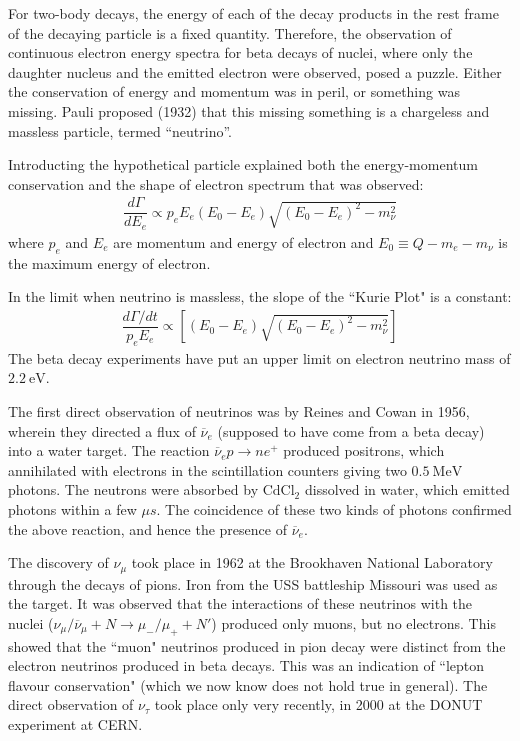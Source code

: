 For two-body decays, the energy of each of the decay products in the rest frame of the decaying particle is a fixed quantity. Therefore, the observation of continuous electron energy spectra for beta decays of nuclei, where only the daughter nucleus and the emitted electron were observed, posed a puzzle. Either the conservation of energy and momentum was in peril, or something was missing. Pauli proposed (1932) that this missing something is a chargeless and massless particle, termed “neutrino”.

Introducting the hypothetical particle explained both the energy-momentum conservation and the shape of electron spectrum that was observed: 
\begin{eqnarray}
    \dfrac{d \Gamma}{d E_e} \propto p_e E_e\left(E_0 - E_e\right) \sqrt{\left(E_0 - E_e\right)^2 - m_\nu ^2}
\end{eqnarray}
where \(p_e\) and \(E_e\) are momentum and energy of electron and \(E_0 \equiv Q - m_e - m_\nu\) is the maximum energy of electron. 

In the limit when neutrino is massless, the slope of the ``Kurie Plot" is a constant:
\begin{eqnarray}
    \dfrac{d\Gamma / dt}{p_e E_e} \propto \left[(E_0 - E_e)\sqrt{(E_0 - E_e)^2 - m_\nu ^2}\right]
\end{eqnarray}
The beta decay experiments have put an upper limit on electron neutrino mass of \(2.2~\mathrm{eV}\). 

The first direct observation of neutrinos was by Reines and Cowan in 1956\cite{cowan1956detection}, wherein they directed a flux of \(\overline {\nu} _e\) (supposed to have come from a beta decay) into a water target. The reaction \(\overline {\nu} _e p \to n e^+\) produced positrons, which annihilated with electrons in the scintillation counters giving two $0.5 ~\mathrm{MeV}$ photons. The neutrons were absorbed by $\mathrm{CdCl_2}$ dissolved in water, which emitted photons within a few $\mu s$. The coincidence of these two kinds of photons confirmed the above reaction, and hence the presence of \(\overline {\nu} _e\). 

The discovery of \({\nu} _\mu\) took place in 1962 at the Brookhaven National Laboratory \cite{brookhaven} through the decays of pions. Iron from the USS battleship Missouri was used as the target. It was observed that the interactions of these neutrinos with the nuclei (\(\nu_\mu /\overline {\nu}_\mu +N \to \mu _ - /\mu _+ + N' \)) produced only muons, but no electrons. This showed that the ``muon" neutrinos produced in pion decay were distinct from the electron neutrinos produced in beta decays. This was an indication of ``lepton flavour conservation" (which we now know does not hold true in general). The direct observation of \(\nu _\tau\) took place only very recently, in 2000 at the DONUT experiment \cite{KODAMA2001218} at CERN. 